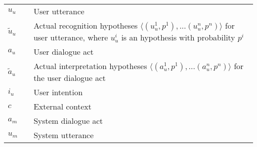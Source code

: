 \begin{tabular}{lp{5mm}p{11cm}}
$u_u$ && User utterance \\
$\tilde{u}_u$ && Actual recognition hypotheses $\langle (u_u^1, p^1), ... (u_u^n, p^n)\rangle$ for user utterance, where $u_u^i$ is an hypothesis with probability $p^i$ \\
$a_u$ && User dialogue act \\
$\tilde{a}_u$ && Actual interpretation hypotheses $\langle (a_u^1, p^1), ... (a_u^n, p^n)\rangle$ for the user dialogue act \\
$i_u$ && User intention \\
$c$ && External context \\
$a_m$ && System dialogue act \\
$u_m$ && System utterance \\

\end{tabular}
